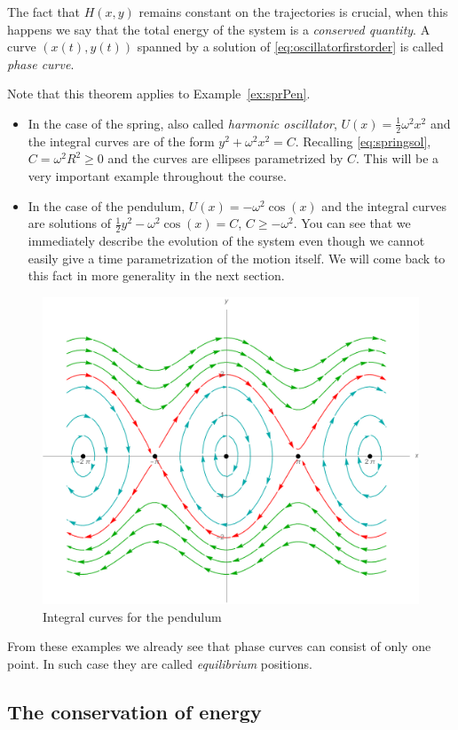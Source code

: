 \documentclass[english,fontsize=11pt,paper=a5,oneside]{scrbook}
\theoremstyle{definition}
\begin{document}
The fact that $H(x,y)$ remains constant on the trajectories is crucial, when this happens we say that the total energy of the system is a \emph{conserved quantity}.
A curve $(x(t), y(t))$ spanned by a solution of \eqref{eq:oscillatorfirstorder} is called \emph{phase curve}.

Note that this theorem applies to Example~\ref{ex:sprPen}.
\begin{itemize}
    \item In the case of the spring, also called \emph{harmonic oscillator}, $U(x) = \frac12 \omega^2 x^2$ and the integral curves are of the form $y^2 + \omega^2 x^2 = C$.
    Recalling \eqref{eq:springsol}, $C = \omega^2 R^2 \geq 0$ and the curves are ellipses parametrized by $C$. 
    This will be a very important example throughout the course.
    \item In the case of the pendulum, $U(x) = -\omega^2 \cos(x)$ and the integral curves are solutions of $\frac12 y^2 - \omega^2 \cos(x) = C$, $C \geq -\omega^2$.
    You can see that we immediately describe the evolution of the system even though we cannot easily give a time parametrization of the motion itself.
    We will come back to this fact in more generality in the next section.
\end{itemize}

\begin{figure}[ht]
    \centering
    \includegraphics[width=.7\linewidth]{images/pendulum.pdf}
    \caption{Integral curves for the pendulum}
    \label{fig:pendulum}
\end{figure}

From these examples we already see that phase curves can consist of only one point. In such case they are called \emph{equilibrium} positions.

\subsection{The conservation of energy}\label{sec:energy}
\end{document}
